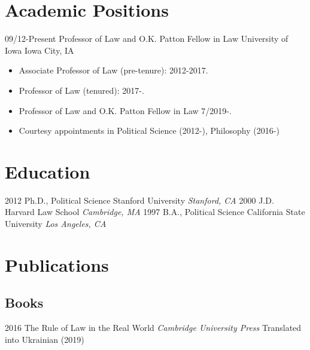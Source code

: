 \documentclass[letterpaper]{moderncv}
\begin{document}
\makecvtitle

\lfoot{\thepage}

%
%
\section{Academic Positions}
\cventry
{09/12-Present}
{Professor of Law and O.K. Patton Fellow in Law}
{University of Iowa}
{Iowa City, IA}
{}
{\begin{itemize}%
	\item Associate Professor of Law (pre-tenure): 2012-2017.
	\item Professor of Law (tenured): 2017-.
  \item Professor of Law and O.K. Patton Fellow in Law 7/2019-.
	\item Courtesy appointments in Political Science (2012-), Philosophy (2016-)
	\end{itemize}}
%
%
\section{Education}
\cventry
{2012}
{Ph.D., Political Science}
{Stanford University}
{}
{\textit{Stanford, CA}}
{}
\cventry
{2000}
{J.D.}
{Harvard Law School}
{}
{\textit{Cambridge, MA}}
{}
\cventry
{1997}
{B.A., Political Science}
{California State University}
{}
{\textit{Los Angeles, CA}}
{}
%
%
\section{Publications}
\subsection{Books}
\cventry
{2016}
{The Rule of Law in the Real World}
{}
{\textit{Cambridge University Press}}
{}
{Translated into Ukrainian (2019)}
\vspace{1mm}
\vspace{1mm}
\end{document}
